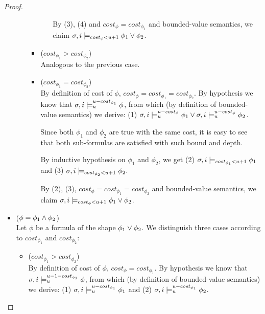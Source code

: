 \begin{theorem}
\begin{lemma}
\begin{proof}
\begin{itemize}
\begin{itemize}
\begin{itemize}
\begin{itemize}
                By (3), (4) and $cost_{\phi} = cost_{\phi_1}$ and bounded-value semantics, we claim $\sigma,i \models_{cost_\phi < u + 1} \phi_1 \lor \phi_2$.
            \end{itemize}
            
            \item ($cost_{\phi_1} > cost_{\phi_2}$) \\
            Analogous to the previous case.
            
            \item ($cost_{\phi_1} = cost_{\phi_2}$) \\
            By definition of cost of $\phi$, $cost_\phi = cost_{\phi_1} = cost_{\phi_2}$.
            By hypothesis we know that $\sigma,i \models_{u}^{u-cost_{\phi_1}} \phi$, from which (by definition of bounded-value semantics) we derive: 
            (1) $\sigma,i \models_{u}^{u-cost_\phi} \phi_1 \lor \sigma,i \models_{u}^{u-cost_\phi} \phi_2$.

            Since both $\phi_1$ and $\phi_2$ are true with the same cost, it is easy to see that both sub-formulas are satisfied with such bound and depth.

            By inductive hypothesis on $\phi_1$ and $\phi_2$, we get (2) $\sigma,i \models_{cost_{\phi_1} < u + 1} \phi_1$ and (3) $\sigma,i \models_{cost_{\phi_2} < u + 1} \phi_2$.

            By (2), (3), $cost_\phi = cost_{\phi_1} = cost_{\phi_2}$ and bounded-value semantics, we claim $\sigma,i \models_{cost_\phi < u + 1} \phi_1 \lor \phi_2$.
        \end{itemize}
    \end{itemize}
    
    \item ($\phi = \phi_1 \land \phi_2$) \\
    Let $\phi$ be a formula of the shape $\phi_1 \lor \phi_2$.
    We distinguish three cases according to $cost_{\phi_1}$ and $cost_{\phi_2}$:
    \begin{itemize}
        \item ($cost_{\phi_1} > cost_{\phi_2}$) \\
        By definition of cost of $\phi$, $cost_\phi = cost_{\phi_1}$.
        By hypothesis we know that $\sigma,i \models_{u}^{u-1-cost_{\phi_1}} \phi$, from which (by definition of bounded-value semantics) we derive: 
        (1) $\sigma,i \models_{u}^{u-cost_{\phi_1}} \phi_1$ and
        (2) $\sigma,i \models_{u}^{u-cost_{\phi_1}} \phi_2$.


\end{itemize}
\end{itemize}
\end{proof}
\end{lemma}
\end{theorem}
